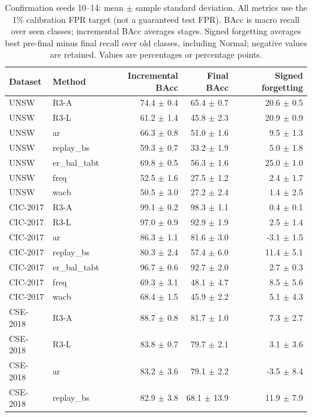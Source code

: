 \begin{table}[t]\centering\scriptsize
\caption{Confirmation seeds 10--14: mean $\pm$ sample standard deviation. All metrics use the 1\% calibration FPR target (not a guaranteed test FPR). BAcc is macro recall over seen classes; incremental BAcc averages stages. Signed forgetting averages best pre-final minus final recall over old classes, including Normal; negative values are retained. Values are percentages or percentage points.}
\label{tab:section165-confirmation}
\begin{tabular}{llrrr}\toprule
Dataset & Method & Incremental BAcc & Final BAcc & Signed forgetting \\\midrule
UNSW & R3-A & 74.4 $\pm$ 0.4 & 65.4 $\pm$ 0.7 & 20.6 $\pm$ 0.5 \\
UNSW & R3-L & 61.2 $\pm$ 1.4 & 45.8 $\pm$ 2.3 & 20.9 $\pm$ 0.9 \\
UNSW & ar & 66.3 $\pm$ 0.8 & 51.0 $\pm$ 1.6 & 9.5 $\pm$ 1.3 \\
UNSW & replay\_bs & 59.3 $\pm$ 0.7 & 33.2 $\pm$ 1.9 & 5.0 $\pm$ 1.8 \\
UNSW & er\_bal\_tabt & 69.8 $\pm$ 0.5 & 56.3 $\pm$ 1.6 & 25.0 $\pm$ 1.0 \\
UNSW & freq & 52.5 $\pm$ 1.6 & 27.5 $\pm$ 1.2 & 2.4 $\pm$ 1.7 \\
UNSW & wacb & 50.5 $\pm$ 3.0 & 27.2 $\pm$ 2.4 & 1.4 $\pm$ 2.5 \\
CIC-2017 & R3-A & 99.1 $\pm$ 0.2 & 98.3 $\pm$ 1.1 & 0.4 $\pm$ 0.1 \\
CIC-2017 & R3-L & 97.0 $\pm$ 0.9 & 92.9 $\pm$ 1.9 & 2.5 $\pm$ 1.4 \\
CIC-2017 & ar & 86.3 $\pm$ 1.1 & 81.6 $\pm$ 3.0 & -3.1 $\pm$ 1.5 \\
CIC-2017 & replay\_bs & 80.3 $\pm$ 2.4 & 57.4 $\pm$ 6.0 & 11.4 $\pm$ 5.1 \\
CIC-2017 & er\_bal\_tabt & 96.7 $\pm$ 0.6 & 92.7 $\pm$ 2.0 & 2.7 $\pm$ 0.3 \\
CIC-2017 & freq & 69.3 $\pm$ 3.1 & 48.1 $\pm$ 4.7 & 8.5 $\pm$ 5.6 \\
CIC-2017 & wacb & 68.4 $\pm$ 1.5 & 45.9 $\pm$ 2.2 & 5.1 $\pm$ 4.3 \\
CSE-2018 & R3-A & 88.7 $\pm$ 0.8 & 81.7 $\pm$ 1.0 & 7.3 $\pm$ 2.7 \\
CSE-2018 & R3-L & 83.8 $\pm$ 0.7 & 79.7 $\pm$ 2.1 & 3.1 $\pm$ 3.6 \\
CSE-2018 & ar & 83.2 $\pm$ 3.6 & 79.1 $\pm$ 2.2 & -3.5 $\pm$ 8.4 \\
CSE-2018 & replay\_bs & 82.9 $\pm$ 3.8 & 68.1 $\pm$ 13.9 & 11.9 $\pm$ 7.9 \\
\bottomrule\end{tabular}\end{table}

